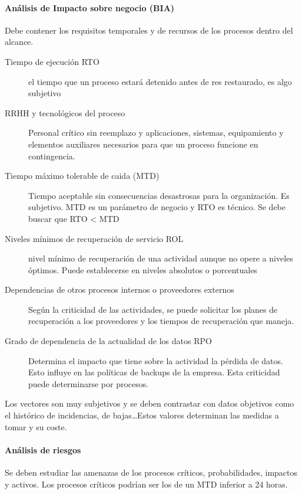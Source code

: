         \paragraph{Análisis de Impacto sobre negocio (BIA)}
            Debe contener los requisitos temporales y de recursos de los procesos dentro del alcance.
            \begin{description}
                \item[Tiempo de ejecución RTO] el tiempo que un proceso estará detenido antes de res restaurado, es algo subjetivo
                \item[RRHH y tecnológicos del proceso] Personal crítico sin reemplazo y aplicaciones, sistemas, equipamiento y elementos auxiliares necesarios para que un proceso funcione en contingencia.
                \item[Tiempo máximo tolerable de caida (MTD)] Tiempo aceptable sin consecuencias desastrosas para la organización. Es subjetivo. MTD es un parámetro de negocio y RTO es técnico. Se debe buscar que RTO < MTD
                \item[Niveles mínimos de recuperación de servicio ROL] nivel mínimo de recuperación de una actividad aunque no opere a niveles óptimos. Puede establecerse en niveles absolutos o porcentuales
                \item[Dependencias de otros procesos internos o proveedores externos] Según la criticidad de las actividades, se puede solicitar los planes de recuperación a los proveedores y los tiempos de recuperación que maneja.
                \item[Grado de dependencia de la actualidad de los datos RPO] Determina el impacto que tiene sobre la actividad la pérdida de datos. Esto influye en las políticas de backups de la empresa. Esta criticidad puede determinarse por procesos.
            \end{description}

            Los vectores son muy subjetivos y se deben contrastar con datos objetivos como el histórico de incidencias, de bajas\dots Estos valores determinan las medidas a tomar y su coste.

        \paragraph{Análisis de riesgos}
            Se deben estudiar las amenazas de los procesos críticos, probabilidades, impactos y activos. Los procesos críticos podrían ser los de un MTD inferior a 24 horas.

